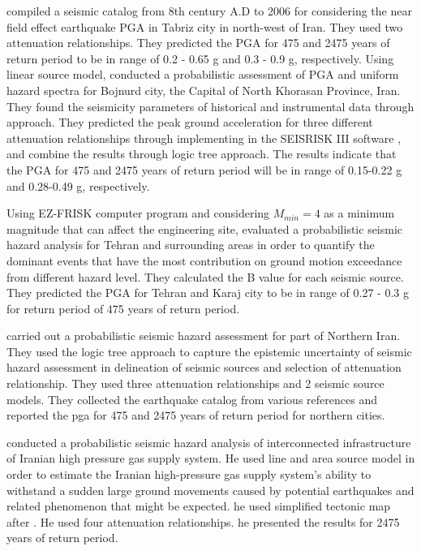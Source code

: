 \noindent
\citet{Vafaie2011} compiled a seismic catalog from 8th century A.D to 2006 for considering the near field effect earthquake PGA in Tabriz city in north-west of Iran. They used two attenuation relationships. They predicted the PGA for 475 and 2475 years of return period to be in range of 0.2 - 0.65 g and 0.3 - 0.9 g, respectively.  
\noindent
Using linear source model,\citet{Rahgozar2012} conducted a probabilistic assessment of PGA and uniform hazard spectra for Bojnurd city, the Capital of North Khorasan Province, Iran. They found the seismicity parameters of historical and instrumental data through \citet{Kijko2000} approach. They predicted the peak ground acceleration for three different attenuation relationships through implementing in the SEISRISK III software \citep{Bender1982}, and combine the results through logic tree approach. 
The results indicate that the PGA for 475 and 2475 years of return period will be in range of 0.15-0.22 g and 0.28-0.49 g, respectively.

\noindent
Using  EZ-FRISK computer program and considering $M_{min} = 4$ as a minimum magnitude that can affect the engineering site, \citet{Abdi2013} evaluated a probabilistic seismic hazard analysis for Tehran and surrounding areas in order to quantify the dominant events that have the most contribution on ground motion exceedance from different hazard level. They calculated the B value for each seismic source. They predicted the PGA for Tehran and Karaj city to be in range of 0.27 - 0.3 g for return period of 475 years of return period. 

\noindent
\citet{Abdollahzadeh2014a} carried out a probabilistic seismic hazard assessment for part of Northern Iran. They used the logic tree approach to capture the epistemic uncertainty of seismic hazard assessment in delineation of seismic sources and selection of attenuation relationship. They used three attenuation relationships and 2 seismic source models. They collected the earthquake catalog from various references and reported the pga for 475 and 2475 years of return period for northern cities.   

\noindent
\citet{Golara2014} conducted a probabilistic seismic hazard analysis of interconnected infrastructure of Iranian high pressure gas supply system. He used line and area source model in order to estimate the Iranian  high-pressure gas supply system's ability to withstand a sudden large ground movements caused by potential earthquakes and related phenomenon that might be expected. he used simplified tectonic map after \citet{Alavi1991}. He used four attenuation relationships. he presented the results for 2475 years of return period. 

